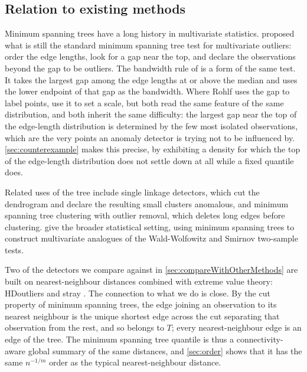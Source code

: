 
\subsection{Relation to existing methods}\label{sec:related}

Minimum spanning trees have a long history in multivariate statistics. \citet{Rohlf1975} proposed what is still the standard minimum spanning tree test for multivariate outliers: order the edge lengths, look for a gap near the top, and declare the observations beyond the gap to be outliers. The bandwidth rule of \citet{lookout} is a form of the same test. It takes the largest gap among the edge lengths at or above the median and uses the lower endpoint of that gap as the bandwidth. Where Rohlf uses the gap to label points, \citet{lookout} use it to set a scale, but both read the same feature of the same distribution, and both inherit the same difficulty: the largest gap near the top of the edge-length distribution is determined by the few most isolated observations, which are the very points an anomaly detector is trying not to be influenced by. \cref{sec:counterexample} makes this precise, by exhibiting a density for which the top of the edge-length distribution does not settle down at all while a fixed quantile does.

Related uses of the tree include single linkage detectors, which cut the dendrogram and declare the resulting small clusters anomalous, and minimum spanning tree clustering with outlier removal, which deletes long edges before clustering. \citet{FriedmanRafsky1979} give the broader statistical setting, using minimum spanning trees to construct multivariate analogues of the Wald-Wolfowitz and Smirnov two-sample tests.

Two of the detectors we compare against in \cref{sec:compareWithOtherMethods} are built on nearest-neighbour distances combined with extreme value theory: HDoutliers \citep{wilkinson2017visualizing,hdoutliers} and stray \citep{stray}. The connection to what we do is close. By the cut property of minimum spanning trees, the edge joining an observation to its nearest neighbour is the unique shortest edge across the cut separating that observation from the rest, and so belongs to $T$; every nearest-neighbour edge is an edge of the tree. The minimum spanning tree quantile is thus a connectivity-aware global summary of the same distances, and \cref{sec:order} shows that it has the same $n^{-1/m}$ order as the typical nearest-neighbour distance.

